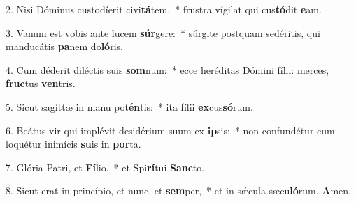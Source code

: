 2. Nisi Dóminus custodíerit civi\textbf{tá}tem,~*  frustra vígilat qui cus\textbf{tó}dit \textbf{e}am.\

3. Vanum est vobis ante lucem \textbf{súr}gere:~*  súrgite postquam sedéritis, qui manducátis \textbf{pa}nem do\textbf{ló}ris.\

4. Cum déderit diléctis suis \textbf{som}num:~*  ecce heréditas Dómini fílii: merces, \textbf{fruc}tus \textbf{ven}tris.\

5. Sicut sagíttæ in manu pot\textbf{én}tis:~*  ita fílii \textbf{ex}cus\textbf{só}rum.\

6. Beátus vir qui implévit desidérium suum ex \textbf{ip}sis:~*  non confundétur cum loquétur inimícis \textbf{su}is in \textbf{por}ta.\

7. Glória Patri, et \textbf{Fí}lio,~*  et Spi\textbf{rí}tui \textbf{Sanc}to.\

8. Sicut erat in princípio, et nunc, et \textbf{sem}per,~*  et in sǽcula sæcu\textbf{ló}rum. \textbf{A}men.\

